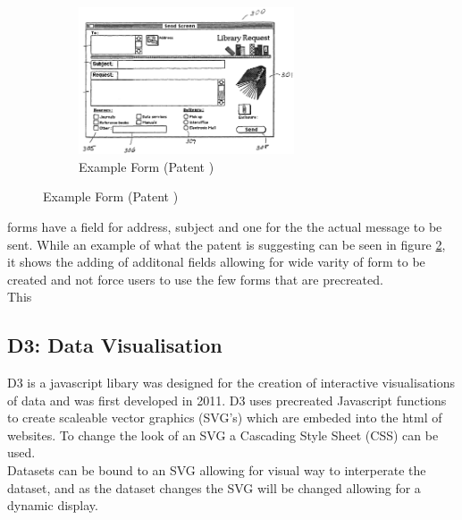 \documentclass[12pt]{article}  %
\begin{document}
\begin{figure}
\vspace*{-\baselineskip}
\begin{figure}[H]
   \includegraphics[width=0.7\textwidth]{images/emailform.png}
	\caption{Example Form (Patent \cite{holt_customizing_2006})}
	\label{fig:emailform}
\end{figure} 
\end{figure}

\noindent
forms have a field for address, subject and one for the the actual message to be sent. While an example of what the patent is suggesting can be seen in figure \ref{fig:emailform}, it shows the adding of additonal fields allowing for wide varity of form to be created and not force users to use the few forms that are precreated.\\
This 



\subsection{D3: Data Visualisation}
D3 \cite{bostock_d3.js_????} is a javascript libary was designed for the creation of interactive visualisations of data and was first developed in 2011. D3 uses precreated Javascript functions to create scaleable vector graphics (SVG's) which are embeded into the html of websites. To change the look of an SVG a Cascading Style Sheet (CSS) can be used.  \\
Datasets can be bound to an SVG allowing for visual way to interperate the dataset, and as the dataset changes the SVG will be changed allowing for a dynamic display.   
\end{document}
